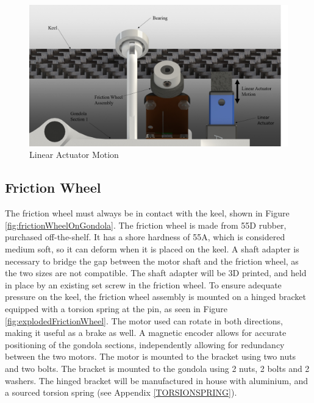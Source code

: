 \documentclass[../main.tex]{subfiles}
\begin{document}
\begin{figure}[H]
	\centering
	\includegraphics[width=.8\linewidth]{img/design/gondola/linearActuatorAndMotor.png}
	\caption{Linear Actuator Motion}
	\label{fig:linearActuatorAndMotor}
\end{figure}

\subsection{Friction Wheel}
The friction wheel must always be in contact with the keel, shown in Figure \ref{fig:frictionWheelOnGondola}. The friction wheel is made from 55D rubber, purchased off-the-shelf. It has a shore hardness of 55A, which is considered medium soft, so it can deform when it is placed on the keel. A shaft adapter is necessary to bridge the gap between the motor shaft and the friction wheel, as the two sizes are not compatible. The shaft adapter will be 3D printed, and held in place by an existing set screw in the friction wheel. To ensure adequate pressure on the keel, the friction wheel assembly is mounted on a hinged bracket equipped with a torsion spring at the pin, as seen in Figure \ref{fig:explodedFrictionWheel}. The motor used can rotate in both directions, making it useful as a brake as well. A magnetic encoder allows for accurate positioning of the gondola sections, independently allowing for redundancy between the two motors. The motor is mounted to the bracket using two nuts and two bolts. The bracket is mounted to the gondola using 2 nuts, 2 bolts and 2 washers. The hinged bracket will be manufactured in house with aluminium, and a sourced torsion spring (see Appendix \ref{TORSIONSPRING}).
\end{document}
